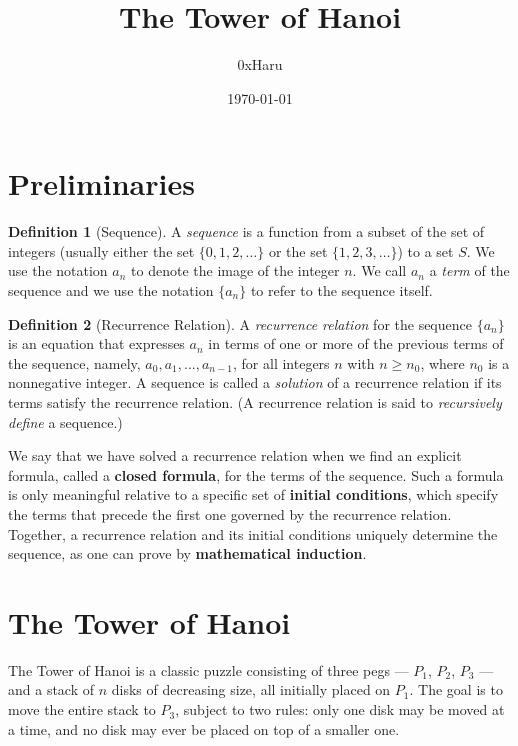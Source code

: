 \documentclass[12pt, a4paper]{article}
\title{\textbf{The Tower of Hanoi}\\[0.4em]}
\author{0xHaru}
\date{\today}
\theoremstyle{definition}
\newtheorem{definition}{Definition}[section]
\theoremstyle{plain}
\theoremstyle{remark}
\begin{document}
\maketitle

\section{Preliminaries}

\begin{definition}[Sequence]
A \emph{sequence} is a function from a subset of the set of integers
(usually either the set $\{0, 1, 2, \ldots\}$ or the set $\{1, 2, 3, \ldots\}$)
to a set $S$. We use the notation $a_n$ to denote the image of the integer $n$.
We call $a_n$ a \emph{term} of the sequence and we use the notation $\{a_n\}$ to refer to the sequence itself.
\end{definition}

\begin{definition}[Recurrence Relation]
A \emph{recurrence relation} for the sequence $\{a_n\}$ is an equation that
expresses $a_n$ in terms of one or more of the previous terms of the sequence,
namely, $a_0, a_1, \ldots, a_{n-1}$, for all integers $n$ with $n \ge n_0$,
where $n_0$ is a nonnegative integer. A sequence is called a \emph{solution}
of a recurrence relation if its terms satisfy the recurrence relation.
(A recurrence relation is said to \emph{recursively define} a sequence.)
\end{definition}

We say that we have solved a recurrence relation when we find an explicit
formula, called a \textbf{closed formula}, for the terms of the sequence.
Such a formula is only meaningful relative to a specific set of
\textbf{initial conditions}, which specify the terms that precede the first
one governed by the recurrence relation. Together, a recurrence relation and
its initial conditions uniquely determine the sequence, as one can prove by
\textbf{mathematical induction}.

\section{The Tower of Hanoi}

The Tower of Hanoi is a classic puzzle consisting of three pegs --- $P_1$,
$P_2$, $P_3$ --- and a stack of $n$ disks of decreasing size, all initially
placed on $P_1$. The goal is to move the entire stack to $P_3$, subject to two
rules: only one disk may be moved at a time, and no disk may ever be placed on
top of a smaller one.
\end{document}
